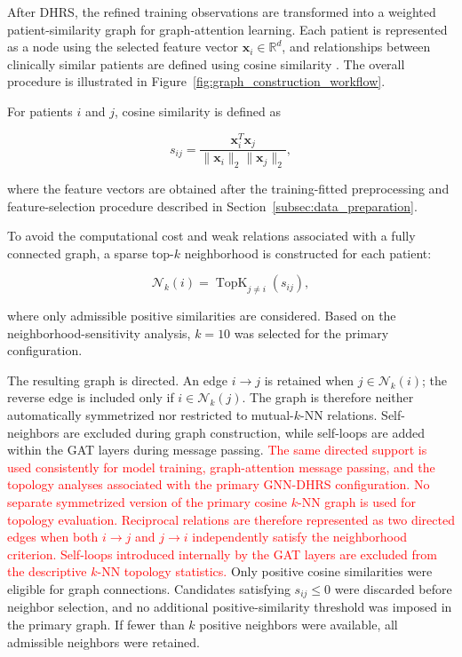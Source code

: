 \documentclass[pdflatex,sn-mathphys-num]{sn-jnl}%
\theoremstyle{thmstyleone}%
\theoremstyle{thmstyletwo}%
\theoremstyle{thmstylethree}%
\begin{document}
After DHRS, the refined training observations are transformed into a weighted
patient-similarity graph for graph-attention learning. Each patient is
represented as a node using the selected feature vector
\(\mathbf{x}_i\in\mathbb{R}^{d}\), and relationships between clinically
similar patients are defined using cosine similarity
\cite{kipf2017semi,hamilton2017inductive,velickovic2018graph}.
The overall procedure is illustrated in
Figure~\ref{fig:graph_construction_workflow}.

For patients \(i\) and \(j\), cosine similarity is defined as

\begin{equation}
s_{ij}
=
\frac{
\mathbf{x}_i^{T}\mathbf{x}_j
}{
\|\mathbf{x}_i\|_2
\|\mathbf{x}_j\|_2
},
\label{eq:cosine_similarity}
\end{equation}

where the feature vectors are obtained after the training-fitted preprocessing
and feature-selection procedure described in
Section~\ref{subsec:data_preparation}.

To avoid the computational cost and weak relations associated with a fully
connected graph, a sparse top-\(k\) neighborhood is constructed for each
patient:

\begin{equation}
\mathcal{N}_k(i)
=
\operatorname{TopK}_{j\ne i}
\left(
s_{ij}
\right),
\label{eq:topk_neighbors}
\end{equation}

where only admissible positive similarities are considered. Based on the
neighborhood-sensitivity analysis, \(k=10\) was selected for the primary
configuration.

 {
The resulting graph is directed. An edge \(i\rightarrow j\) is retained when
\(j\in\mathcal{N}_k(i)\); the reverse edge is included only if
\(i\in\mathcal{N}_k(j)\). The graph is therefore neither automatically
symmetrized nor restricted to mutual-\(k\)-NN relations. Self-neighbors are
excluded during graph construction, while self-loops are added within the GAT
layers during message passing.
}
\textcolor{red}{
The same directed support is used consistently for model training,
graph-attention message passing, and the topology analyses associated with the
primary GNN-DHRS configuration. No separate symmetrized version of the primary
cosine \(k\)-NN graph is used for topology evaluation. Reciprocal relations
are therefore represented as two directed edges when both
\(i\rightarrow j\) and \(j\rightarrow i\) independently satisfy the
neighborhood criterion. Self-loops introduced internally by the GAT layers
are excluded from the descriptive \(k\)-NN topology statistics.
}
 {
Only positive cosine similarities were eligible for graph connections.
Candidates satisfying \(s_{ij}\leq0\) were discarded before neighbor
selection, and no additional positive-similarity threshold was imposed in the
primary graph. If fewer than \(k\) positive neighbors were available, all
admissible neighbors were retained.
}
\end{document}
